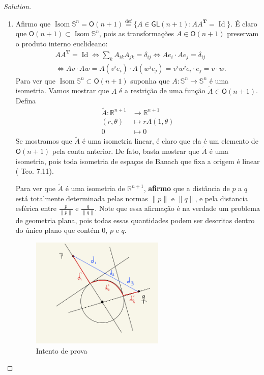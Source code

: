 \begin{proof}[Solution]
\begin{enumerate}[label=(\alph*)]
\item Afirmo que \(\operatorname{Isom}\mathbb{S}^n=\mathsf{O}(n+1)\overset{\operatorname{def}}{=}\{A \in \mathsf{GL}(n+1):A A^{\mathbf{T}}=\operatorname{Id}\}\). É claro que \(\mathsf{O}(n+1)\subset \operatorname{Isom}\mathbb{S}^{n}\), pois as transformações \(A \in \mathsf{O}(n+1)\) preservam o produto interno euclideano:
\begin{align*}
&A A^{\mathbf{T}}=\operatorname{Id}\iff \sum_k A_{ik}A_{jk}=\delta_{ij} \iff Ae_i\cdot Ae_j=\delta_{ij}\\ &\iff Av\cdot Aw=A\left( v^ie_i\right) \cdot A\left( w^je_j\right) =v^iw^j e_i\cdot e_j=v\cdot w.
\end{align*}
	Para ver que \(\operatorname{Isom}\mathbb{S}^n \subset\mathsf{O}(n+1)\) suponha que \(A:\mathbb{S}^n \to \mathbb{S}^n\) é uma isometria. Vamos mostrar que \(A\) é a restrição de uma função \(\tilde{A} \in \mathsf{O}(n+1)\). Defina
	\begin{align*}
		\tilde{A}: \mathbb{R}^{n+1} &\longrightarrow \mathbb{R}^{n+1} \\
		(r,\theta) &\longmapsto rA(1,\theta)\\
		0&\longmapsto 0
	\end{align*}
	Se mostramos que \(\tilde{A}\) é uma isometria linear, é claro que ela é um elemento de \(\mathsf{O}(n+1)\) pela conta anterior. De fato, basta mostrar que \(\tilde{A}\) é uma isometria, pois toda isometria de espaços de Banach que fixa a origem é linear (\cite{braga} Teo. 7.11).

	Para ver que \(\tilde{A}\) é uma isometria de \(\mathbb{R}^{n+1}\), \textbf{afirmo}  que a distância de \(p\) a \(q\) está totalmente determinada pelas normas  \(\|p\|\) e \(\|q\|\), e pela distancia esférica entre  \(\frac{p}{\|p\|}\) e \(\frac{q}{\|q\|}\). Note que essa afirmação é na verdade um problema de geometria plana, pois todas essas quantidades podem ser descritas dentro do único plano que contém \(0\), \(p\) e \(q\).
\begin{figure}[H]
	\centering
	\includegraphics[width=0.6\textwidth]{fig1}
	\caption{Intento de prova}
\end{figure}


\end{enumerate}
\end{proof}
